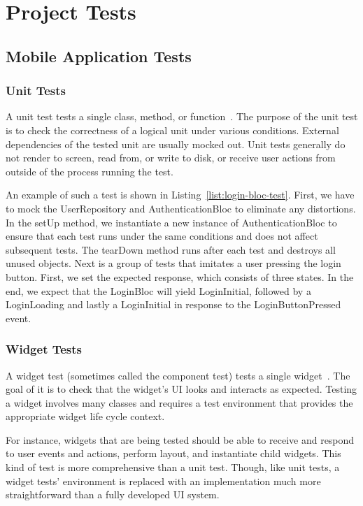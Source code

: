 \chapter{Project Tests}
\section{Mobile Application Tests}
\subsection{Unit Tests}
A unit test tests a single class, method, or function~\cite{testing-flutter}. The purpose of the unit test is to check the correctness of a logical unit under various conditions. External dependencies of the tested unit are usually mocked out. Unit tests generally do not render to screen, read from, or write to disk, or receive user actions from outside of the process running the test.

An example of such a test is shown in Listing~\ref{list:login-bloc-test}. First, we have to mock the UserRepository and AuthenticationBloc to eliminate any distortions. In the setUp method, we instantiate a new instance of AuthenticationBloc to ensure that each test runs under the same conditions and does not affect subsequent tests. The tearDown method runs after each test and destroys all unused objects. Next is a group of tests that imitates a user pressing the login button. First, we set the expected response, which consists of three states. In the end, we expect that the LoginBloc will yield LoginInitial, followed by a LoginLoading and lastly a LoginInitial in response to the LoginButtonPressed event.



\subsection{Widget Tests}
A widget test (sometimes called the component test) tests a single widget~\cite{testing-flutter}. The goal of it is to check that the widget's UI looks and interacts as expected. Testing a widget involves many classes and requires a test environment that provides the appropriate widget life cycle context.

For instance, widgets that are being tested should be able to receive and respond to user events and actions, perform layout, and instantiate child widgets. This kind of test is more comprehensive than a unit test. Though, like unit tests, a widget tests' environment is replaced with an implementation much more straightforward than a fully developed UI system.


